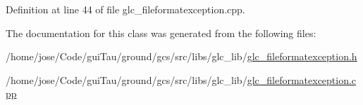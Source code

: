 Definition at line 44 of file glc\-\_\-fileformatexception.\-cpp.



The documentation for this class was generated from the following files\-:\begin{DoxyCompactItemize}
\item 
/home/jose/\-Code/gui\-Tau/ground/gcs/src/libs/glc\-\_\-lib/\hyperlink{glc__fileformatexception_8h}{glc\-\_\-fileformatexception.\-h}\item 
/home/jose/\-Code/gui\-Tau/ground/gcs/src/libs/glc\-\_\-lib/\hyperlink{glc__fileformatexception_8cpp}{glc\-\_\-fileformatexception.\-cpp}\end{DoxyCompactItemize}
